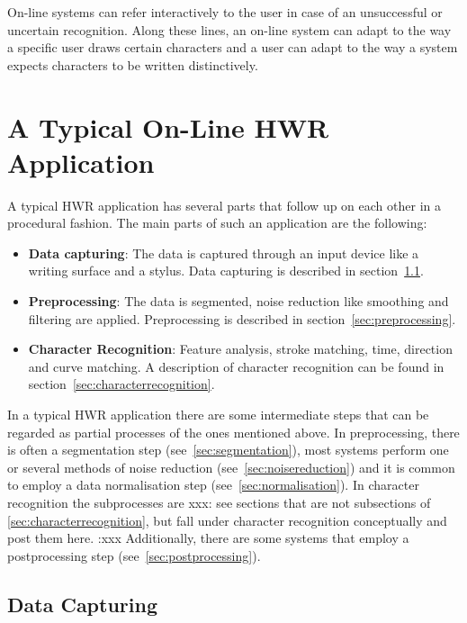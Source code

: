 On-line systems can refer interactively to the user in case of an unsuccessful 
or uncertain recognition. Along these lines, an on-line system can adapt to 
the way a specific user draws certain characters and a user can adapt to the
way a system expects characters to be written distinctively.

\section{A Typical On-Line HWR Application}
\label{sec:atypicalonlinehwrapplication}

A typical HWR application has several parts that follow up on each other in a
procedural fashion. The main parts of such an application are the following:
\begin{itemize}
\item \textbf{Data capturing}: The data is captured through an input device 
  like a writing surface and a stylus. Data capturing is described in
  section~\ref{sec:datacapturing}.
\item \textbf{Preprocessing}: The data is segmented, noise reduction like 
  smoothing and filtering are applied. Preprocessing is described in 
  section~\ref{sec:preprocessing}.
\item \textbf{Character Recognition}: Feature analysis, stroke matching, time, 
  direction and curve matching. A description of character recognition can be 
  found in section~\ref{sec:characterrecognition}.
\end{itemize}
In a typical HWR application there are some intermediate steps that can be 
regarded as partial processes of the ones mentioned above. In preprocessing,
there is often a segmentation step (see~\ref{sec:segmentation}), most systems 
perform one or several methods of noise reduction (see~\ref{sec:noisereduction}) and it is common to employ a data normalisation step 
(see~\ref{sec:normalisation}). In character recognition the subprocesses are 
xxx: see sections that are not subsections of \ref{sec:characterrecognition}, but fall under character recognition conceptually and post them here. :xxx
Additionally, there are some systems that employ a postprocessing step 
(see~\ref{sec:postprocessing}). 

\subsection{Data Capturing}
\label{sec:datacapturing}

